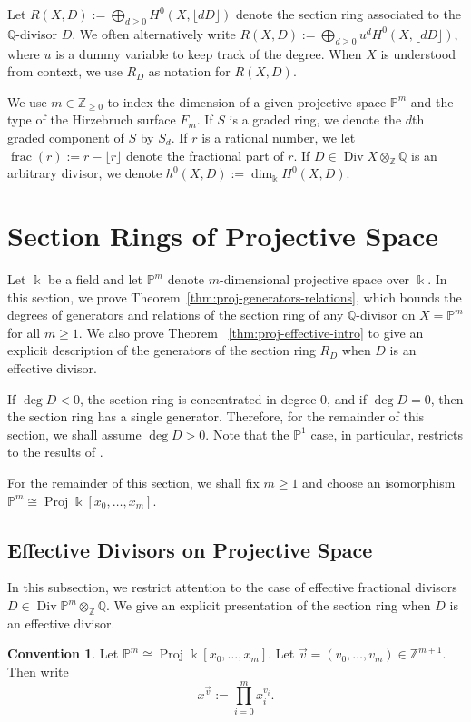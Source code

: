 \documentclass{amsart}
\theoremstyle{plain}
\theoremstyle{definition}
\newtheorem{convention}[thm]{Convention}
\theoremstyle{remark}
\numberwithin{equation}{section}
\newcommand\ssec{\subsection}
\newcommand\bq{{\mathbb Q}}
\newcommand\bp{{\mathbb P}}
\newcommand\bz{{\mathbb Z}}
\newcommand\bk{{\Bbbk}}
\DeclareMathOperator\di{Div}
\newcommand\hirz{F}
\DeclareMathOperator{\fr}{frac}
\DeclareMathOperator{\proj}{Proj}
\begin{document}
Let $R(X, D) := \bigoplus_{d \geq 0} H^0(X, \lfloor dD \rfloor)$
denote the section ring associated to the $\bq$-divisor $D$. 
We often alternatively write
$R(X, D) := \bigoplus_{d \geq 0} u^d H^0(X, \lfloor dD \rfloor)$, where $u$ is a dummy
variable to keep track of the degree.
When $X$ is understood from context, we use $R_D$ as notation for $R(X, D)$.

We use $m \in \bz_{\geq 0}$ to index the dimension of a given
projective space $\bp^m$ and the type of the Hirzebruch surface
$\hirz_m$. If $S$ is a graded ring, we denote the $d$th graded
component of $S$ by $S_d$. If $r$ is a rational number, we let
$\fr(r) := r - \lfloor r \rfloor$ denote the fractional part of $r$. 
If $D \in \di X \otimes_\bz \bq$ is an arbitrary divisor, we denote
$h^0(X, D) := \dim_\bk H^0(X,D)$.



\section{Section Rings of Projective Space}
\label{sec:proj}
Let $\bk$ be a field and let $\bp^m$ denote $m$-dimensional
projective space over $\bk$. In this section, we prove
Theorem~\ref{thm:proj-generators-relations}, which bounds the degrees
of generators and relations of the section ring of any $\bq$-divisor
on $X = \bp^m$ for all $m \geq 1$. We also prove
Theorem ~\ref{thm:proj-effective-intro} to give an explicit
description of the generators of the section ring $R_D$ when $D$ is
an effective divisor.

If $\deg D < 0$, the
section ring is concentrated in degree 0, and if
$\deg D = 0$, then the section ring has a single
generator. Therefore, for the remainder of this section,
we shall assume $\deg D > 0$.
Note that the $\bp^1$ case, in particular, restricts to the results
of \cite{dorney:canonical}.

For the remainder of this section, we shall fix $m \geq 1$ and
choose an
isomorphism $\bp^m \cong \proj \bk[x_0, \ldots, x_m]$.


\ssec{Effective Divisors on Projective Space}
\label{ssec:proj-one-point}

In this subsection, we restrict attention to the case of effective
fractional divisors $D \in \di \bp^m \otimes_\bz \bq$. We give an explicit presentation of the section ring when $D$ is an effective
divisor.

\begin{convention}
Let $\bp^m \cong \proj \bk[x_0, \ldots, x_m]$. Let
$\vec{v} = (v_0, \ldots, v_m) \in \bz^{m + 1}$.  Then write
\[
	x^{\vec{v}} := \prod_{i = 0}^{m} x_i^{v_i}.
\]
\end{convention}
\end{document}
